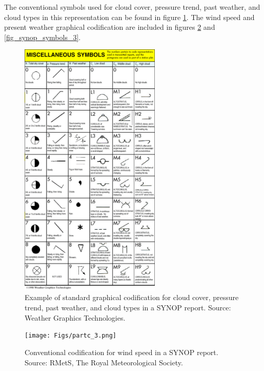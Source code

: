 \documentclass{article}
\begin{document}
The conventional symbols used for cloud cover, pressure trend, past weather, and cloud types in this representation can be found in figure \ref{fig_synop_symbols_1}. The wind speed and present weather graphical codification are included in figures \ref{fig_synop_symbols_2} and \ref{fig_synop_symbols_3}.


\begin{figure}[h]
\begin{center}
\includegraphics[width=0.6\textwidth]{Figs/wxcode2.png}
\caption{Example of standard graphical codification for cloud cover, pressure trend, past weather, and cloud types in a SYNOP report. Source: Weather Graphics Technologies.}\label{fig_synop_symbols_1}
\end{center}
\end{figure}

\begin{figure}[h]
\begin{center}
\texttt{[image: Figs/partc\_3.png]}
\caption{Conventional codification for wind speed in a SYNOP report. Source: RMetS, The Royal Meteorological Society.}\label{fig_synop_symbols_2}
\end{center}
\end{figure}
\end{document}
